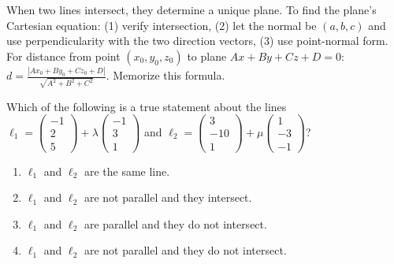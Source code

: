 \begin{takeaways}
When two lines intersect, they determine a unique plane. To find the plane's Cartesian equation: (1) verify intersection, (2) let the normal be $(a,b,c)$ and use perpendicularity with the two direction vectors, (3) use point-normal form. For distance from point $(x_0, y_0, z_0)$ to plane $Ax + By + Cz + D = 0$: $d = \tfrac{|Ax_0 + By_0 + Cz_0 + D|}{\sqrt{A^2 + B^2 + C^2}}$. Memorize this formula.
\end{takeaways}

\vspace{1em}

\begin{problem}
Which of the following is a true statement about the lines \\ 
$\ell_1 = \begin{pmatrix} -1 \\ 2 \\ 5 \end{pmatrix} + \lambda \begin{pmatrix} -1 \\ 3 \\ 1 \end{pmatrix}$ and 
$\ell_2 = \begin{pmatrix} 3 \\ -10 \\ 1 \end{pmatrix} + \mu \begin{pmatrix} 1 \\ -3 \\ -1 \end{pmatrix}$?
\begin{enumerate}[label=\Alph*.]
    \item $\ell_1$ and $\ell_2$ are the same line.
    \item $\ell_1$ and $\ell_2$ are not parallel and they intersect.
    \item $\ell_1$ and $\ell_2$ are parallel and they do not intersect.
    \item $\ell_1$ and $\ell_2$ are not parallel and they do not intersect.
\end{enumerate}
\end{problem}

